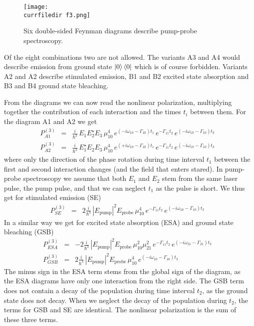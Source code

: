 \begin{figure}
\texttt{[image: \\currfiledir f3.png]}
\caption{
Six double-sided Feynman diagrams describe pump-probe spectroscopy.}
\label{fig_2d_f3}
\end{figure}

Of the eight combinations two are not allowed. The variants A3 and A4 would describe  emission from ground state  $\ket{0} \bra{0}$ which is of course forbidden. Variants A2 and A2 describe stimulated emission, B1 and B2 excited state absorption and B3 and B4 ground state bleaching.

From the diagrams we can now read the nonlinear polarization, multiplying together the contribution of each interaction and the times $t_i$ between them.
For the diagram A1 and A2 we get
\begin{eqnarray}
P^{(3)}_{A1} & =& \frac{i}{\hbar^3} \,  E_1 E_2^\star E_3 \, \mu_{10}^4 \,
e^{ (-i \omega_{10} - \Gamma_{10}) t_1 } \,
e^{  - \Gamma_{11} t_2 } \,
e^{ (-i \omega_{10} - \Gamma_{10}) t_3 }  \\
P^{(3)}_{A2} & =& \frac{i}{\hbar^3} \,  E_1^\star E_2 E_3 \, \mu_{10}^4 \,
e^{ (+i \omega_{10} - \Gamma_{10}) t_1 } \,
e^{  - \Gamma_{11} t_2 } \,
e^{ (-i \omega_{10} - \Gamma_{10}) t_3 }  
\end{eqnarray}
where only the direction of the phase rotation during time interval $t_1$ between the first and second interaction changes (and the field that enters stared). In pump-probe spectroscopy we assume that both $E_1$ and $E_2$ stem from the same laser pulse, the pump pulse, and that we can neglect $t_1$ as the pulse is short. We thus get for stimulated emission (SE)
\begin{eqnarray}
P^{(3)}_{SE} & =& 2 \frac{i}{\hbar^3} \,  | E_\text{pump}|^2 E_\text{probe} \, \mu_{10}^4 \,
e^{  - \Gamma_{11} t_2 } \,
e^{ (-i \omega_{10} - \Gamma_{10}) t_3 } 
\end{eqnarray}
In a similar way we get for excited state absorption (ESA) and ground state bleaching (GSB)
\begin{eqnarray}
P^{(3)}_{ESA} & =& -2 \frac{i}{\hbar^3} \,  | E_\text{pump}|^2 E_\text{probe} \, \mu_{10}^2 \mu_{21}^2 \,
e^{  - \Gamma_{11} t_2 } \,
e^{ (-i \omega_{21} - \Gamma_{21}) t_3 }  \\
P^{(3)}_{GSB}  & =& 2 \frac{i}{\hbar^3} \,  | E_\text{pump}|^2 E_\text{probe} \, \mu_{10}^4 \,
e^{ (-i \omega_{10} - \Gamma_{10}) t_3 } 
\end{eqnarray}
The minus sign in the ESA term stems from the global sign of the diagram, as the ESA diagrams have only one interaction from the right side. The GSB term does not contain a decay of the population during time interval $t_2$, as the ground state does not decay. When we neglect the decay of the population during $t_2$, the terms for GSB and SE are identical. The nonlinear polarization is the sum of these three terms.


